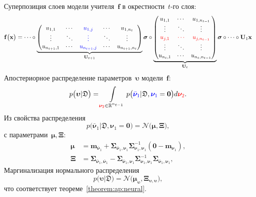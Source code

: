 Суперпозиция слоев модели учителя~$\mathbf{f}$ в окрестности~$t$-го слоя:
{\small
\[
\setlength\abovedisplayskip{0pt}
\mathbf{f}\bigr(\mathbf{x}\bigr) = \cdots \circ
\underbrace{
\begin{pmatrix}
u_{1,1} & \cdots & {\color{blue} u_{1,j}} & \cdots & u_{1,n_{t}} \\
\vdots  & \ddots & {\color{blue} \vdots}  & \ddots & \vdots \\
u_{n_{t+1},1} & \cdots & {\color{blue} u_{n_{t+1},j}} & \cdots & u_{n_{t+1},n_{t}} \\
\end{pmatrix} 
}_{\mathbf{U}_{t+1}}
\bm{\sigma} 
\circ 
\underbrace{
\begin{pmatrix}
u_{1,1} & \cdots & u_{1,n_{t-1}} \\
\vdots  & \ddots & \vdots        \\
{\color{red} u_{j,1}} & {\color{red}\cdots} & {\color{red} u_{j,n_{t-1}}} \\
\vdots  & \ddots & \vdots        \\
u_{n_{t},1} & \cdots & u_{n_{t},n_{t-1}} \\
\end{pmatrix}
}_{\mathbf{U}_{t}}
\bm{\sigma}
\circ 
\cdots
\circ 
\mathbf{U}_1
\mathbf{x}
\setlength\belowdisplayskip{0pt}
\]
}
Апостериорное распределение параметров~$\bm{\upsilon}$ модели~$\mathbf{f}$:
\[
\setlength\abovedisplayskip{0pt}
p\bigr(\bm{\upsilon}|\mathfrak{D}\bigr)  = \int\limits_{{\color{red} \bm{\nu}_2} \in \mathbb{R}^{n_{t-1}}}p\bigr({\color{blue}\bar{\bm{\nu}}_1}|\mathfrak{D}, {\color{blue}\bm{\nu}_1}=\mathbf{0}\bigr) d{\color{red} \bm{\nu}_2}.
\setlength\belowdisplayskip{0pt}
\]
Из свойства распределения 
\[
    p\bigr(\bar{\bm{\nu}}_1|\mathfrak{D}, \bm{\nu}_1=\mathbf{0}\bigr) = \mathcal{N}\bigr(\bm{\mu}, \bm{\Xi}\bigr),
\]
с параметрами~$\bm{\mu}, \bm{\Xi}$:
\[
\begin{aligned}
\bm{\mu} &= \mathbf{m}_{\bar{\bm{\nu}}_1}+\bm{\Sigma}_{\bar{\bm{\nu}}_1,\bm{\nu}_1} \bm{\Sigma}_{\bm{\nu}_1,\bm{\nu}_1}^{-1} \left(\mathbf{0} - \mathbf{m}_{\bm{\nu}_1}\right), \\
 \bm{\Xi} &= \bm{\Sigma}_{\bar{\bm{\nu}}_1,\bar{\bm{\nu}}_1} - \bm{\Sigma}_{\bar{\bm{\nu}}_1,\bm{\nu}_1} \bm{\Sigma}_{\bm{\nu}_1,\bm{\nu}_1}^{-1} \bm{\Sigma}_{\bar{\bm{\nu}}_1,\bm{\nu}_1},
\end{aligned}
\]
Маргинализация нормального распределения
\[
p\bigr(\bm{\upsilon}|\mathfrak{D}\bigr) = \mathcal{N}\bigr(\bm{\mu}_{\bm{\upsilon}},  \bm{\Xi}_{\bm{\upsilon}, \bm{\upsilon}}\bigr),
\]
что соответствует теореме~\ref{theorem:ap:neural}.

